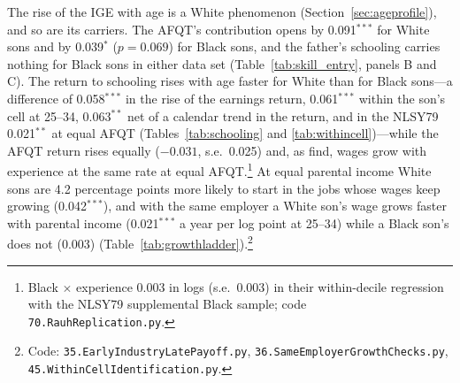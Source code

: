 The rise of the IGE with age is a White phenomenon (Section~\ref{sec:ageprofile}), and so are its carriers. The AFQT's
contribution opens by 0.091$^{***}$ for White sons and by 0.039$^{*}$ ($p = 0.069$) for Black sons, and the father's
schooling carries nothing for Black sons in either data set (Table~\ref{tab:skill_entry}, panels B and C). The return to
schooling rises with age faster for White than for Black sons---a difference of 0.058$^{***}$ in the rise of the earnings
return, 0.061$^{***}$ within the son's cell at 25--34, 0.063$^{**}$ net of a calendar trend in the return, and in the
NLSY79 0.021$^{**}$ at equal AFQT (Tables~\ref{tab:schooling} and \ref{tab:withincell})---while the AFQT return rises
equally ($-0.031$, s.e.\ 0.025) and, as \citet{rauh2023black} find, wages grow with experience at the same rate at equal
AFQT.\footnote{Black $\times$ experience 0.003 in logs (s.e.\ 0.003) in their within-decile regression with the NLSY79
supplemental Black sample; code \texttt{70.RauhReplication.py}.} At equal parental income White sons are 4.2
percentage points more likely to start in the jobs whose wages keep growing (0.042$^{***}$), and with the same employer a
White son's wage grows faster with parental income (0.021$^{***}$ a year per log point at 25--34) while a Black son's
does not (0.003) (Table~\ref{tab:growthladder}).\footnote{Code: \texttt{35.EarlyIndustryLatePayoff.py},
\texttt{36.SameEmployerGrowthChecks.py}, \texttt{45.WithinCellIdentification.py}.}




